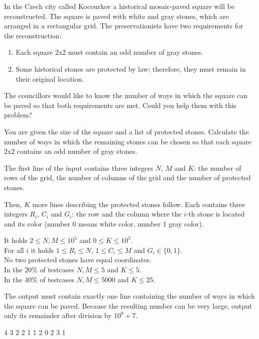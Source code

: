 





In the Czech city called Kocourkov a historical mosaic-paved square will be
reconstructed. The square is paved with white and gray stones, which are
arranged in a rectangular grid. The preservationists have two requirements for
the reconstruction:

\begin{enumerate}[nolistsep]
\item Each square 2x2 must contain an odd number of gray stones.
\item Some historical stones are protected by law; therefore, they must remain
  in their original location.
\end{enumerate}

The councillors would like to know the number of ways in which the square can be
paved so that both requirements are met. Could you help them with this problem?


You are given the size of the square and a list of protected stones. Calculate
the number of ways in which the remaining stones can be chosen so that each
square 2x2 contains an odd number of gray stones.


The first line of the input contains three integers $N$, $M$ and $K$: the number
of rows of the grid, the number of columns of the grid and the number of
protected stones.

Then, $K$ more lines describing the protected stones follow. Each contains three
integers $R_i$, $C_i$ and $G_i$: the row and the column where the $i$-th stone
is located and its color (number 0 means white color, number 1 gray color).

\bigskip
\noindent
It holds $2 \leq N,M \leq 10^5$ and $0 \leq K \leq 10^5$.\\
For all $i$ it holds $1 \leq R_i \leq N$, $1 \leq C_i \leq M$ and
  $G_i \in \{ 0, 1 \}$.\\
No two protected stones have equal coordinates.\\
In the $20\%$ of testcases $N,M \leq 5$ and $K \leq 5$.\\
In the $40\%$ of testcases $N,M \leq 5000$ and $K \leq 25$.


The output must contain exactly one line containing the number of ways in which
the square can be paved. Because the resulting number can be very large, output
only its remainder after division by $10^9 + 7$.


 4 3
2 2 1
1 2 0
2 3 1
\sampleEND


